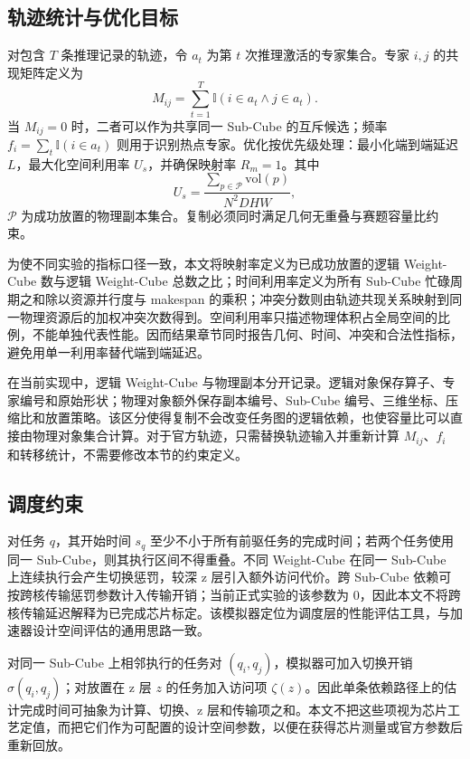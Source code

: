 \subsection{轨迹统计与优化目标}
对包含 $T$ 条推理记录的轨迹，令 $a_t$ 为第 $t$ 次推理激活的专家集合。专家 $i,j$ 的共现矩阵定义为
\begin{equation}
M_{ij}=\sum_{t=1}^{T}\mathbb{I}(i\in a_t\land j\in a_t).
\end{equation}
当 $M_{ij}=0$ 时，二者可以作为共享同一 Sub-Cube 的互斥候选；频率 $f_i=\sum_t\mathbb{I}(i\in a_t)$ 则用于识别热点专家。优化按优先级处理：最小化端到端延迟 $L$，最大化空间利用率 $U_s$，并确保映射率 $R_m=1$。其中
\begin{equation}
U_s=\frac{\sum_{p\in\mathcal{P}}\mathrm{vol}(p)}{N^2DHW},
\end{equation}
$\mathcal{P}$ 为成功放置的物理副本集合。复制必须同时满足几何无重叠与赛题容量比约束。

为使不同实验的指标口径一致，本文将映射率定义为已成功放置的逻辑 Weight-Cube 数与逻辑 Weight-Cube 总数之比；时间利用率定义为所有 Sub-Cube 忙碌周期之和除以资源并行度与 makespan 的乘积；冲突分数则由轨迹共现关系映射到同一物理资源后的加权冲突次数得到。空间利用率只描述物理体积占全局空间的比例，不能单独代表性能。因而结果章节同时报告几何、时间、冲突和合法性指标，避免用单一利用率替代端到端延迟。

在当前实现中，逻辑 Weight-Cube 与物理副本分开记录。逻辑对象保存算子、专家编号和原始形状；物理对象额外保存副本编号、Sub-Cube 编号、三维坐标、压缩比和放置策略。该区分使得复制不会改变任务图的逻辑依赖，也使容量比可以直接由物理对象集合计算。对于官方轨迹，只需替换轨迹输入并重新计算 $M_{ij}$、$f_i$ 和转移统计，不需要修改本节的约束定义。

\subsection{调度约束}
对任务 $q$，其开始时间 $s_q$ 至少不小于所有前驱任务的完成时间；若两个任务使用同一 Sub-Cube，则其执行区间不得重叠。不同 Weight-Cube 在同一 Sub-Cube 上连续执行会产生切换惩罚，较深 z 层引入额外访问代价。跨 Sub-Cube 依赖可按跨核传输惩罚参数计入传输开销；当前正式实验的该参数为 0，因此本文不将跨核传输延迟解释为已完成芯片标定。该模拟器定位为调度层的性能评估工具，与加速器设计空间评估的通用思路一致\cite{parashar2019timeloop}。

对同一 Sub-Cube 上相邻执行的任务对 $(q_i,q_j)$，模拟器可加入切换开销 $\sigma(q_i,q_j)$；对放置在 z 层 $z$ 的任务加入访问项 $\zeta(z)$。因此单条依赖路径上的估计完成时间可抽象为计算、切换、z 层和传输项之和。本文不把这些项视为芯片工艺定值，而把它们作为可配置的设计空间参数，以便在获得芯片测量或官方参数后重新回放。
